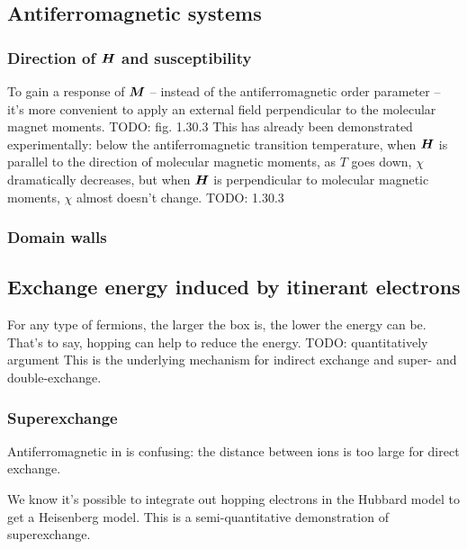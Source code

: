 \documentclass[hyperref, a4paper]{article}
\begin{document}
\subsection{Antiferromagnetic systems}

\subsubsection{Direction of $\vb*{H}$ and susceptibility}

To gain a response of $\vb*{M}$ -- instead of the antiferromagnetic order parameter -- 
it's more convenient to apply an external field 
perpendicular to the molecular magnet moments. TODO: fig. 1.30.3 
This has already been demonstrated experimentally:
below the antiferromagnetic transition temperature,
when $\vb*{H}$ is parallel to the direction of molecular magnetic moments,
as $T$ goes down, $\chi$ dramatically decreases, 
but when $\vb*{H}$ is perpendicular to molecular magnetic moments, 
$\chi$ almost doesn't change. TODO: 1.30.3 

\subsubsection{Domain walls}



\subsection{Exchange energy induced by itinerant electrons}

For any type of fermions, 
the larger the box is, 
the lower the energy can be.
That's to say, 
hopping can help to reduce the energy. TODO: quantitatively argument
This is the underlying mechanism for indirect exchange and 
super- and double-exchange.

\subsubsection{Superexchange}

Antiferromagnetic in  is confusing: 
the distance between  ions is too large for direct exchange.

We know it's possible to integrate out hopping electrons in the Hubbard model 
to get a Heisenberg model.
This is a semi-quantitative demonstration of superexchange.
\end{document}
